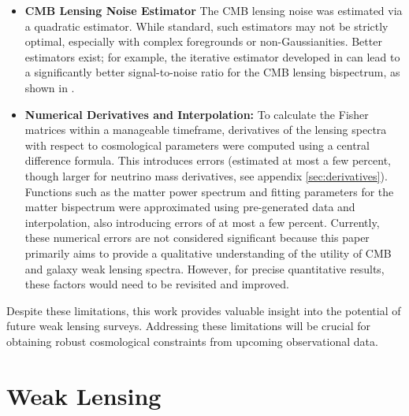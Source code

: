\documentclass[11pt]{article} %
\begin{document}
\begin{itemize}
    \item \textbf{CMB Lensing Noise Estimator} The CMB lensing noise was estimated via a quadratic estimator. While standard, such estimators may not be strictly optimal, especially with complex foregrounds or non-Gaussianities. Better estimators exist; for example, the iterative estimator developed in \cite{Smith_2012} can lead to a significantly better signal-to-noise ratio for the CMB lensing bispectrum, as shown in \cite{Namikawa_2016}.
    \item \textbf{Numerical Derivatives and Interpolation:} To calculate the Fisher matrices within a manageable timeframe, derivatives of the lensing spectra with respect to cosmological parameters were computed using a central difference formula.  This introduces errors (estimated at most a few percent, though larger for neutrino mass derivatives, see appendix \ref{sec:derivatives}). Functions such as the matter power spectrum and fitting parameters for the matter bispectrum were approximated using pre-generated data and interpolation, also introducing errors of at most a few percent. Currently, these numerical errors are not considered significant because this paper primarily aims to provide a qualitative understanding of the utility of CMB and galaxy weak lensing spectra.  However, for precise quantitative results, these factors would need to be revisited and improved.
\end{itemize}

Despite these limitations, this work provides valuable insight into the potential of future weak lensing surveys. Addressing these limitations will be crucial for obtaining robust cosmological constraints from upcoming observational data.

\printbibliography

\appendix

\section{Weak Lensing}\label{sec:weaklensing}
\end{document}

